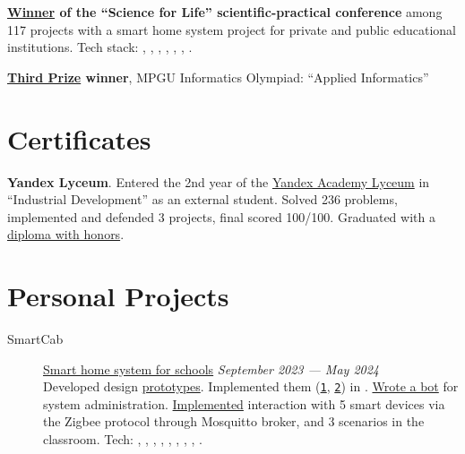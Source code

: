 \documentclass[margin,line]{resume}
\begin{document}
\begin{resume}
  \textbf{\href{https://alchemmist.github.io/CV/attachments/scince-for-life-win.pdf}{Winner}
  of the “Science for Life” scientific-practical conference}
  among 117 projects with a smart home system project for private and public
  educational institutions. Tech stack: ,
  , , ,
  , , .

  \textbf{\href{https://alchemmist.github.io/CV/attachments/informatics-olimpic.pdf}{Third Prize}
  winner}, MPGU Informatics Olympiad:
  “Applied Informatics”

  \section{\mysidestyle Certificates}
  \textbf{Yandex Lyceum}. Entered the 2nd year of the
  \href{https://lyceum.yandex.ru/}{Yandex Academy Lyceum}
  in “Industrial Development” as an external student. Solved 236 problems,
  implemented and defended 3 projects, final scored 100/100. Graduated with
  a \href{https://alchemmist.github.io/CV/attachments/yandex-lyceum.pdf}{diploma with honors}.

  \section{\mysidestyle Personal Projects}\vspace{2mm}

  \begin{description}

    \item[SmartCab]\small{\href{https://github.com/smart-cab}{Smart home system for schools} \hfill
      \textsl{September 2023 — May 2024\vspace{1mm}}}\\
      Developed design \href{https://www.figma.com/design/8H1tFpxgmIDV1xp06ndi73/SmartCab?node-id=0-1&p=f}{prototypes}.
      Implemented them
      (\texttt{\href{https://github.com/smart-cab/smart-cab-hub/tree/main/frontend/src}{1}},
      \texttt{\href{https://github.com/smart-cab/smart-cab-dashboard/tree/main/frontend/src}{2}})
      in .
      \href{https://github.com/smart-cab/smartcab-bot}{Wrote a bot}
      for system administration.
      \href{https://github.com/smart-cab/smartcab-hub/blob/main/backend/smartcab/interface/mqtt.py}{Implemented}
      interaction with 5 smart devices via the Zigbee protocol through
      Mosquitto broker, and 3 scenarios in the classroom.
      Tech: , ,
      , ,
      ,
      , ,
      , .
      \vspace{3mm}


\end{description}
\end{resume}
\end{document}

